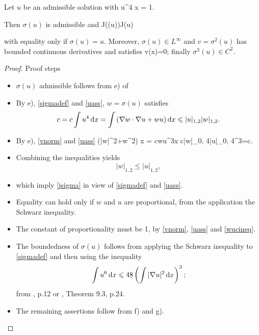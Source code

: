\begin{lemma} \label{sigmalem}
Let $u$ be an admissible solution with
\be\label{uass} \int u^4 \diff x = 1.\ee

Then $\sigma(u)$ is admissible and
\be\label{jsigma}
J(\sigma(u))\leq J(u)
\ee

with equality only if $\sigma(u) = u$. Moreover, $\sigma(u)\in L^\infty$ 
and $v=\sigma^2(u)$ has bounded continuous derivatives and satisfies
\be\label{vlim}
 v(x)=0;
\ee
finally $\sigma^3(u)\in C^2$.
\end{lemma}
\begin{proof}
{\red Proof steps}
\begin{itemize}
    \item $\sigma(u)$ admissible follows from e) of 
    \item By e), \eqref{sigmadef} and \eqref{uass}, $w=\sigma(u)$ satisfies
        $$c=c\int u^4\mathop{}\!\mathrm{d} x=\int\left(\nabla w\cdot \nabla u + wu\right)\mathop{}\!\mathrm{d}
        x\leqslant |u|_{1, 2}|w|_{1, 2}.$$
    \item By e), \eqref{vnorm} and \eqref{uass}
        \be\label{wucineq} 
            \int\left(|\nabla w|^2+w^2\right) \diff x = c\int wu^3\diff x\leq
            c|w|_{0, 4}|u|_{0, 4}^3=c.
        \ee
    \item Combining the inequalities yields
        $$ |w|_{1, 2}\leq |u|_{1, 2},$$
    \item which imply \eqref{jsigma} in view of \eqref{sigmadef} and
        \eqref{uass}.
    \item Equality can hold only if $w$ and $u$ are proportional, from the
        application the Schwarz inequality.
    \item The constant of proportionality must be 1, by \eqref{vnorm},
        \eqref{uass} and \eqref{wucineq}.
    \item The boundedness of $\sigma(u)$ follows from applying the Schwarz
        inequality to \eqref{sigmadef} and then using the inequality
        $$\int u^6\mathop{}\!\mathrm{d} x\leqslant 48\left(\int|\nabla u|^2\mathop{}\!\mathrm{d} x\right)^3;$$
        from {, p.12} or {, Theorem 9.3, p.24}.
    \item The remaining assertions follow from f) and g).
\end{itemize}
\end{proof}

